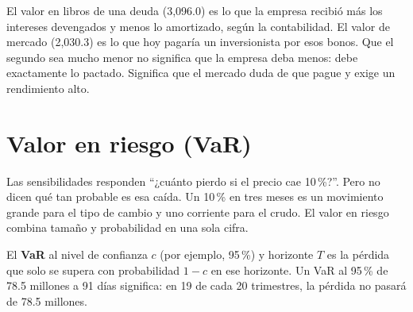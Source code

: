 \begin{cuidado}
El valor en libros de una deuda (3,096.0) es lo que la empresa recibió más los intereses devengados y menos lo amortizado, según la contabilidad. El valor de mercado (2,030.3) es lo que hoy pagaría un inversionista por esos bonos. Que el segundo sea mucho menor no significa que la empresa deba menos: debe exactamente lo pactado. Significa que el mercado duda de que pague y exige un rendimiento alto.
\end{cuidado}

\section{Valor en riesgo (VaR)}\label{sec:var}

Las sensibilidades responden \enquote{¿cuánto pierdo si el precio cae 10\,\%?}. Pero no dicen qué tan probable es esa caída. Un 10\,\% en tres meses es un movimiento grande para el tipo de cambio y uno corriente para el crudo. El valor en riesgo combina tamaño y probabilidad en una sola cifra.

\begin{definicion}
El \textbf{VaR} al nivel de confianza $c$ (por ejemplo, 95\,\%) y horizonte $T$ es la pérdida que solo se supera con probabilidad $1-c$ en ese horizonte. Un VaR al 95\,\% de 78.5 millones a 91 días significa: en 19 de cada 20 trimestres, la pérdida no pasará de 78.5 millones.
\end{definicion}

